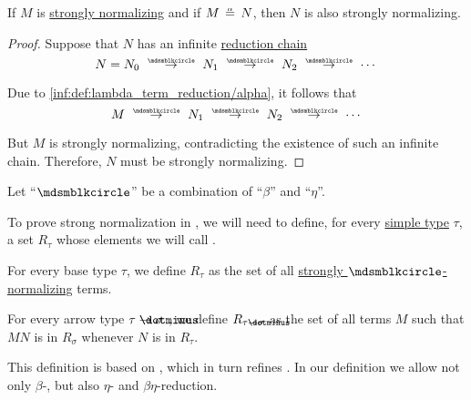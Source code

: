 \begin{proposition}\label{thm:strong_normalization_of_alpha_equivalent_term}
  If \( M \) is \hyperref[def:strongly_normalizing_lambda_term]{strongly normalizing} and if \( M \aequiv N \), then \( N \) is also strongly normalizing.
\end{proposition}
\begin{proof}
  Suppose that \( N \) has an infinite \hyperref[def:lambda_term_reduction_graph]{reduction chain}
  \begin{equation*}
    N = N_0 \pred N_1 \pred N_2 \pred \cdots
  \end{equation*}

  Due to \ref{inf:def:lambda_term_reduction/alpha}, it follows that
  \begin{equation*}
    M \pred N_1 \pred N_2 \pred \cdots
  \end{equation*}

  But \( M \) is strongly normalizing, contradicting the existence of such an infinite chain. Therefore, \( N \) must be strongly normalizing.
\end{proof}

\begin{definition}\label{def:strong_normalization_reducibility_candidate}
  Let \enquote{\( {\Anon} \)} be a combination of \enquote{\( \beta \)} and \enquote{\( \eta \)}.

  To prove strong normalization in , we will need to define, for every \hyperref[def:simple_type]{simple type} \( \tau \), a set \( R_\tau \) whose elements we will call .

  \begin{thmenum}
     For every base type \( \tau \), we define \( R_\tau \) as the set of all \hyperref[def:strongly_normalizing_lambda_term]{strongly \( \Anon \)-normalizing} terms.

     For every arrow type \( \tau \synimplies \sigma \) , we define \( R_{\tau \synimplies \sigma} \) as the set of all terms \( M \) such that \( MN \) is in \( R_\sigma \) whenever \( N \) is in \( R_\tau \).
  \end{thmenum}
\end{definition}
\begin{comments}
  \item This definition is based on , which in turn refines . In our definition we allow not only \( \beta \)-, but also \( \eta \)- and \( \beta\eta \)-reduction.
\end{comments}

